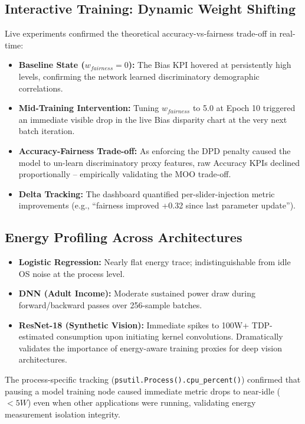 \documentclass[12pt,a4paper]{article}
\begin{document}
\subsection{Interactive Training: Dynamic Weight Shifting}

Live experiments confirmed the theoretical accuracy-vs-fairness trade-off in real-time:

\begin{itemize}
    \item \textbf{Baseline State ($w_{fairness}=0$):} The Bias KPI hovered at persistently high levels, confirming the network learned discriminatory demographic correlations.
    \item \textbf{Mid-Training Intervention:} Tuning $w_{fairness}$ to 5.0 at Epoch 10 triggered an immediate visible drop in the live Bias disparity chart at the very next batch iteration.
    \item \textbf{Accuracy-Fairness Trade-off:} As enforcing the DPD penalty caused the model to un-learn discriminatory proxy features, raw Accuracy KPIs declined proportionally -- empirically validating the MOO trade-off.
    \item \textbf{Delta Tracking:} The dashboard quantified per-slider-injection metric improvements (e.g., ``fairness improved +0.32 since last parameter update'').
\end{itemize}

\subsection{Energy Profiling Across Architectures}

\begin{itemize}
    \item \textbf{Logistic Regression:} Nearly flat energy trace; indistinguishable from idle OS noise at the process level.
    \item \textbf{DNN (Adult Income):} Moderate sustained power draw during forward/backward passes over 256-sample batches.
    \item \textbf{ResNet-18 (Synthetic Vision):} Immediate spikes to 100W+ TDP-estimated consumption upon initiating kernel convolutions. Dramatically validates the importance of energy-aware training proxies for deep vision architectures.
\end{itemize}

The process-specific tracking (\texttt{psutil.Process().cpu\_percent()}) confirmed that pausing a model training node caused immediate metric drops to near-idle ($<5W$) even when other applications were running, validating energy measurement isolation integrity.
\end{document}
